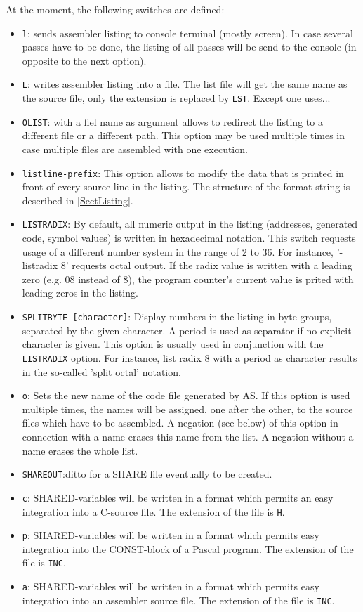 \documentclass[12pt,twoside]{report}
\makeatletter
\newcommand{\tty}[1]{{\tt #1}}
\newcommand{\ttindex}[1]{\index{#1@{\tt #1}}}
\newcommand{\asname}{{AS}}
\makeatother
\begin{document}
At the moment, the following switches are defined:
\ttindex{SHARED}
\begin{itemize}
\item{\tty{l}: sends assembler listing to console terminal (mostly screen).
      In case several passes have to be done, the listing of all
      passes will be send to the console (in opposite to the next
      option).}
\item{\tty{L}: writes assembler listing into a file. The list file will get
      the same name as the source file, only the extension is
      replaced by \tty{LST}.  Except one uses... }
\item{\tty{OLIST}: with a fiel name as argument allows to redirect the
      listing to a different file or a different path.  This option may
      be used multiple times in case multiple files are assembled with
      one execution.}
\item{\tty{listline-prefix}: This option allows to modify the data that
      is printed in front of every source line in the listing.  The
      structure of the format string is described in \ref{SectListing}.}
\item{\label{listradix}\tty{LISTRADIX}: By default, all numeric output in the listing
      (addresses, generated code, symbol values) is written in hexadecimal
      notation.  This switch requests usage of a different number system in the
      range of 2 to 36.  For instance, '-listradix 8' requests octal output.
      If the radix value is written with a leading zero (e.g. 08 instead of 8),
      the program counter's current value is prited with leading zeros in
      the listing.}
\item{\tty{SPLITBYTE [character]}: Display numbers in the listing in byte groups,
      separated by the given character.  A period is used as separator if
      no explicit character is given.  This option is usually used in conjunction
      with the \tty{LISTRADIX} option.  For instance, list radix 8 with a
      period as character results in the so-called 'split octal' notation.}
\item{\tty{o}: Sets the new name of the code file generated by \asname{}.  If this
      option is used multiple times, the names will be assigned, one
      after the other, to the source files which have to be
      assembled.  A negation (see below) of this option in
      connection with a name erases this name from the list.  A
      negation without a name erases the whole list.}
\item{\tty{SHAREOUT}:ditto for a SHARE file eventually to be created.}
\item{\tty{c}: SHARED-variables will be written in a format which permits
      an easy integration into a C-source file.  The extension of
      the file is \tty{H}.}
\item{\tty{p}: SHARED-variables will be written in a format which permits
      easy integration into the CONST-block of a Pascal program.
      The extension of the file is \tty{INC}.}
\item{\tty{a}: SHARED-variables will be written in a format which permits
      easy integration into an assembler source file. The
      extension of the file is \tty{INC}.}
\end{itemize}
\end{document}
